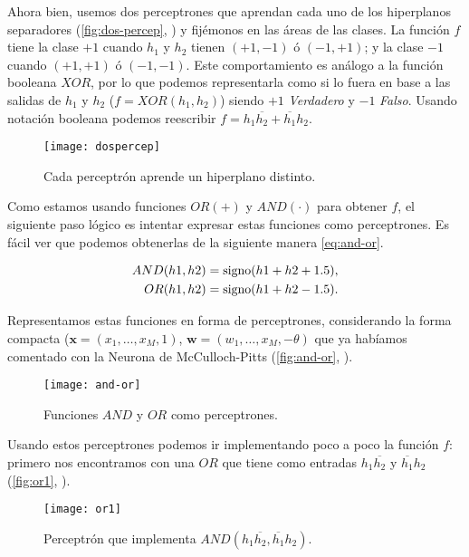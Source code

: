Ahora bien, usemos dos perceptrones que aprendan cada uno de los hiperplanos separadores (\autoref{fig:dos-percep}, \cite{abu2012learning}) y fijémonos en las áreas de las clases. La función $f$ tiene la clase $+1$ cuando $h_1$ y $h_2$ tienen $(+1, -1)$ ó $(-1, +1)$; y la clase $-1$ cuando $(+1, +1)$ ó $(-1, -1)$. Este comportamiento es análogo a la función booleana $XOR$, por lo que podemos representarla como si lo fuera en base a las salidas de $h_1$ y $h_2$ ($f = XOR(h_1, h_2)$) siendo $+1$ \emph{Verdadero} y $-1$ \emph{Falso}. Usando notación booleana podemos reescribir $f = h_1\overline{h_2} + \overline{h_1}h_2$.

\begin{figure}[htpb]
  \centering
  \texttt{[image: dospercep]}
  \caption{Cada perceptrón aprende un hiperplano distinto.}
  \label{fig:dos-percep}
\end{figure}

Como estamos usando funciones $OR (+)$ y $AND (\cdot)$ para obtener $f$, el siguiente paso lógico es intentar expresar estas funciones como perceptrones. Es fácil ver que podemos obtenerlas de la siguiente manera \eqref{eq:and-or}.

\begin{align}
  AND(h1, h2) = \operatorname{signo}(h1 + h2 + 1.5), \\
  OR(h1, h2) = \operatorname{signo}(h1 + h2 - 1.5). \\
  \label{eq:and-or}
\end{align}

Representamos estas funciones en forma de perceptrones, considerando la forma compacta ($\textbf{x} = (x_1, \ldots, x_M, 1)$, $\textbf{w} = (w_1, \ldots, x_M, -\theta)$ que ya habíamos comentado con la Neurona de McCulloch-Pitts (\autoref{fig:and-or}, \cite{abu2012learning}).

\begin{figure}[htpb]
  \centering
  \texttt{[image: and-or]}
  \caption{Funciones $AND$ y $OR$ como perceptrones.}
  \label{fig:and-or}
\end{figure}

Usando estos perceptrones podemos ir implementando poco a poco la función $f$: primero nos encontramos con una $OR$ que tiene como entradas $h_1\overline{h_2}$ y $\overline{h_1}h_2$ (\autoref{fig:or1}, \cite{abu2012learning}).

\begin{figure}[htpb]
  \centering
  \texttt{[image: or1]}
  \caption{Perceptrón que implementa $AND(h_1\overline{h_2}, \overline{h_1}h_2)$.}
  \label{fig:or1}
\end{figure}

